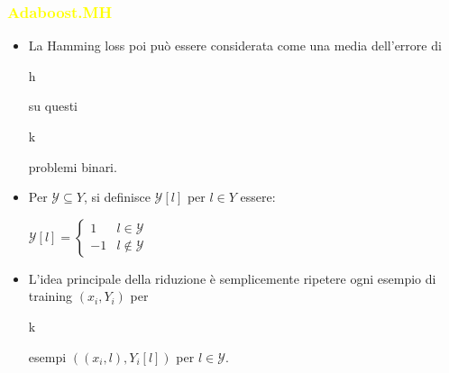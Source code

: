 \documentclass[handout
]{beamer}
\def\yellow#1{{\textcolor{yellow}{#1}}}
\begin{document}
\begin{frame}
\frametitle{\yellow{Adaboost.MH}}
 \begin{itemize}
  \item La Hamming loss poi pu\`o essere considerata come una media dell'errore di \begin{it}h\end{it} su questi 
\begin{it}k\end{it} problemi binari.
\item Per  \begin{math} \mathcal{Y} \subseteq Y \end{math}, si definisce \begin{math}
                                                                    \mathcal{Y}\left[l\right]
                                                                   \end{math} per \begin{math}
                                                                                   l \in Y
                                                                                  \end{math} essere:
\begin{center}
 \begin{math}
   \mathcal{Y}\left[l\right] = \begin{cases}1 & l \in \mathcal{Y}\\
-1 & l\notin \mathcal{Y}\end{cases}
 \end{math}

\end{center}
\item L'idea principale della riduzione \`e semplicemente ripetere ogni 
esempio di training \begin{math}
                     (x_i,Y_i)
                    \end{math} per \begin{it}k\end{it} esempi 
\begin{math}
 ((x_i,l),Y_i\left[l\right])
\end{math} per \begin{math}
                l \in \mathcal{Y}
               \end{math}.

 \end{itemize}
\end{frame}
\end{document}
